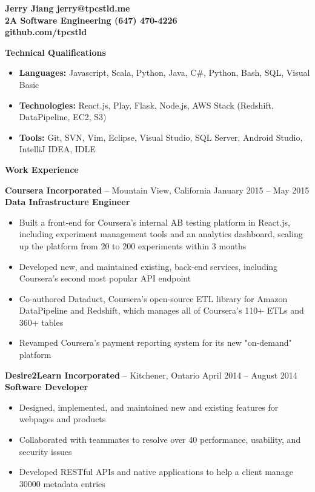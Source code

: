 \documentclass{letter}
\begin{document}
{\bfseries
    {\Large Jerry Jiang} \hfill jerry@tpcstld.me \\
    2A Software Engineering \hfill (647) 470-4226 \\
    \null \hfill github.com/tpcstld} \\
\null \hrulefill

{\bfseries \Large Technical Qualifications}
\vspace{-3mm}
\begin{itemize}
    \item {\bfseries Languages:}
        Javascript, Scala, Python, Java, C\#, Python, Bash, SQL, Visual Basic
    \item {\bfseries Technologies:}
        React.js, Play, Flask, Node.js, AWS Stack (Redshift, DataPipeline, EC2, S3)
    \item {\bfseries Tools:}
        Git, SVN, Vim, Eclipse, Visual Studio, SQL Server, Android Studio, IntelliJ IDEA, IDLE
\end{itemize}

{\bfseries \Large Work Experience}

\vspace{-1.5mm}
{\bfseries Coursera Incorporated} -- Mountain View, California \hfill January 2015 -- May 2015 \\
{\bfseries Data Infrastructure Engineer}
\vspace{-3mm}
\begin{itemize}
    \item Built a front-end for Coursera's internal AB testing platform in React.js, including
      experiment management tools and an analytics dashboard, scaling up the platform from 20 to
      200 experiments within 3 months
    \item Developed new, and maintained existing, back-end services, including Coursera's second
      most popular API endpoint
    \item Co-authored Dataduct, Coursera's open-source ETL library for Amazon DataPipeline and
      Redshift, which manages all of Coursera's 110+ ETLs and 360+ tables
    \item Revamped Coursera's payment reporting system for its new "on-demand" platform
\end{itemize}

\vspace{-1.5mm}
{\bfseries Desire2Learn Incorporated} -- Kitchener, Ontario \hfill April 2014 -- August 2014 \\
{\bfseries Software Developer}
\vspace{-3mm}
\begin{itemize}
    \item Designed, implemented, and maintained new and existing features for webpages and products
    \item Collaborated with teammates to resolve over 40 performance, usability, and security issues
    \item Developed RESTful APIs and native applications to help a client manage 30000 metadata entries
\end{itemize}
\end{document}
